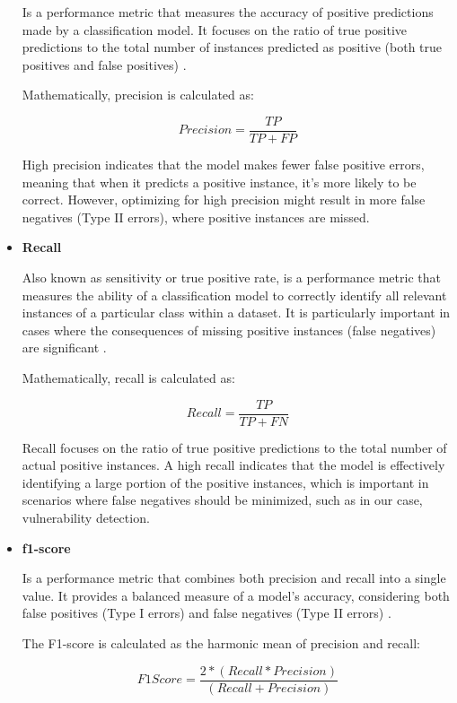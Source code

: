 \begin{itemize}
Is a performance metric that measures the accuracy of positive predictions made by a classification model. It focuses on the ratio of true positive predictions to the total number of instances predicted as positive (both true positives and false positives) \cite{Somogyi2021}.

Mathematically, precision is calculated as:

\begin{equation}\label{Precision_eq}Precision = \frac{TP}{TP + FP}\end{equation}

High precision indicates that the model makes fewer false positive errors, meaning that when it predicts a positive instance, it's more likely to be correct. However, optimizing for high precision might result in more false negatives (Type II errors), where positive instances are missed.

\item \textbf{Recall}

Also known as sensitivity or true positive rate, is a performance metric that measures the ability of a classification model to correctly identify all relevant instances of a particular class within a dataset. It is particularly important in cases where the consequences of missing positive instances (false negatives) are significant \cite{Somogyi2021}.

Mathematically, recall is calculated as:

\begin{equation}\label{Recall_eq}Recall = \frac{TP}{TP + FN}\end{equation}

Recall focuses on the ratio of true positive predictions to the total number of actual positive instances. A high recall indicates that the model is effectively identifying a large portion of the positive instances, which is important in scenarios where false negatives should be minimized, such as in our case, vulnerability detection.

\item \textbf{f1-score}

Is a performance metric that combines both precision and recall into a single value. It provides a balanced measure of a model's accuracy, considering both false positives (Type I errors) and false negatives (Type II errors) \cite{Somogyi2021}.

The F1-score is calculated as the harmonic mean of precision and recall:

\begin{equation}\label{F1_Score_eq}F1 Score = \frac{2*(Recall * Precision)}{(Recall + Precision)}\end{equation}


\end{itemize}
